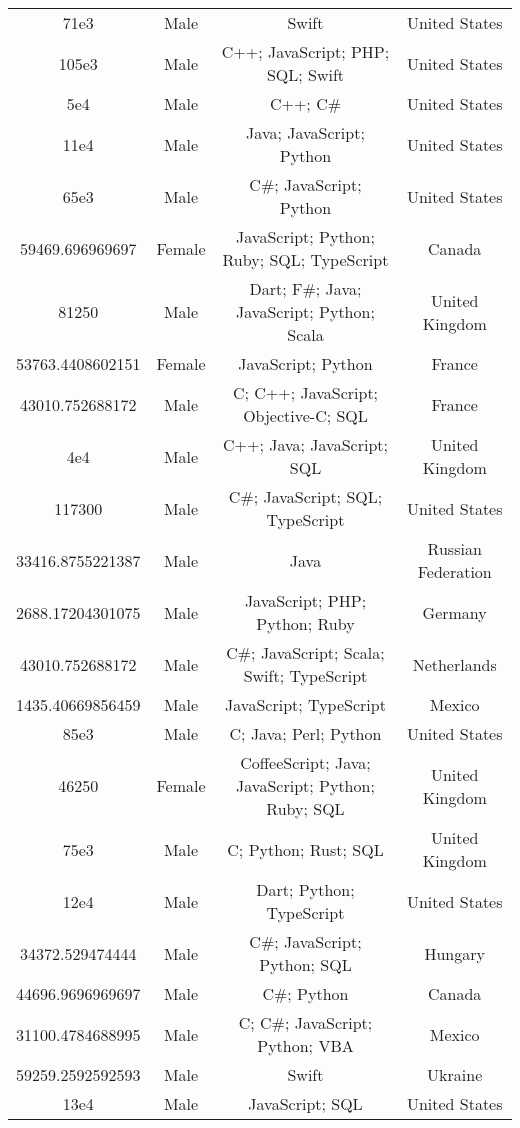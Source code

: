 \begin{center}
\begin{tabular}{ |c|c|c|c| }
71e3  &  Male  &  Swift  &  United States  \\ 
105e3  &  Male  &  C++; JavaScript; PHP; SQL; Swift  &  United States  \\ 
5e4  &  Male  &  C++; C\#  &  United States  \\ 
11e4  &  Male  &  Java; JavaScript; Python  &  United States  \\ 
65e3  &  Male  &  C\#; JavaScript; Python  &  United States  \\ 
59469.696969697  &  Female  &  JavaScript; Python; Ruby; SQL; TypeScript  &  Canada  \\ 
81250  &  Male  &  Dart; F\#; Java; JavaScript; Python; Scala  &  United Kingdom  \\ 
53763.4408602151  &  Female  &  JavaScript; Python  &  France  \\ 
43010.752688172  &  Male  &  C; C++; JavaScript; Objective-C; SQL  &  France  \\ 
4e4  &  Male  &  C++; Java; JavaScript; SQL  &  United Kingdom  \\ 
117300  &  Male  &  C\#; JavaScript; SQL; TypeScript  &  United States  \\ 
33416.8755221387  &  Male  &  Java  &  Russian Federation  \\ 
2688.17204301075  &  Male  &  JavaScript; PHP; Python; Ruby  &  Germany  \\ 
43010.752688172  &  Male  &  C\#; JavaScript; Scala; Swift; TypeScript  &  Netherlands  \\ 
1435.40669856459  &  Male  &  JavaScript; TypeScript  &  Mexico  \\ 
85e3  &  Male  &  C; Java; Perl; Python  &  United States  \\ 
46250  &  Female  &  CoffeeScript; Java; JavaScript; Python; Ruby; SQL  &  United Kingdom  \\ 
75e3  &  Male  &  C; Python; Rust; SQL  &  United Kingdom  \\ 
12e4  &  Male  &  Dart; Python; TypeScript  &  United States  \\ 
34372.529474444  &  Male  &  C\#; JavaScript; Python; SQL  &  Hungary  \\ 
44696.9696969697  &  Male  &  C\#; Python  &  Canada  \\ 
31100.4784688995  &  Male  &  C; C\#; JavaScript; Python; VBA  &  Mexico  \\ 
59259.2592592593  &  Male  &  Swift  &  Ukraine  \\ 
13e4  &  Male  &  JavaScript; SQL  &  United States  \\ 

\end{tabular}
\end{center}
